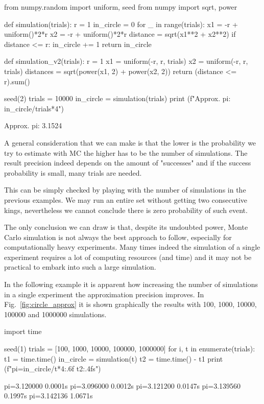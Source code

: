 \begin{ipython}
from numpy.random import uniform, seed
from numpy import sqrt, power

def simulation(trials):
  r = 1
  in_circle = 0
  for _ in range(trials):
      x1 = -r + uniform()*2*r
      x2 = -r + uniform()*2*r
      distance = sqrt(x1**2 + x2**2)
      if distance <= r:
          in_circle += 1
  return in_circle 
  
def simulation_v2(trials):
    r = 1
    x1 = uniform(-r, r, trials)
    x2 = uniform(-r, r, trials)
    distances = sqrt(power(x1, 2) + power(x2, 2))
    return (distance <= r).sum()
	
seed(2)
trials = 10000
in_circle = simulation(trials)
print (f"Approx. pi: {in_circle/trials*4}")  
\end{ipython}
\begin{ioutput}
Approx. pi: 3.1524
\end{ioutput}

A general consideration that we can make is that the lower is the probability we try to estimate with MC the higher has to be the number of simulations. 
The result precision indeed depends on the amount of "successes" and if the success probability is small, many trials are needed. 

This can be simply checked by playing with the number of simulations in the previous examples. We may run an entire set without getting two consecutive kings, nevertheless we cannot conclude there is zero probability of such event.

The only conclusion we can draw is that, despite its undoubted power, Monte Carlo simulation is not always the best approach to follow, especially for computationally heavy experiments. Many times indeed the simulation of a single experiment requires a lot of computing resources (and time) and it may not be practical to embark into such a large simulation.

In the following example it is apparent how increasing the number of simulations in a single experiment the approximation precision improves. In Fig.~\ref{fig:circle_approx} it is shown graphically the results with 100, 1000, 10000, 100000 and 1000000 simulations.

\begin{ipython}
import time

seed(1)
trials = [100, 1000, 10000, 100000, 1000000]
for i, t in enumerate(trials):
    t1 = time.time()
    in_circle = simulation(t)
    t2 = time.time() - t1
    print (f"pi={in_circle/t*4:.6f} {t2:.4f}s")
\end{ipython}
\begin{ioutput}
pi=3.120000 0.0001s
pi=3.096000 0.0012s
pi=3.121200 0.0147s
pi=3.139560 0.1997s
pi=3.142136 1.0671s
\end{ioutput}


